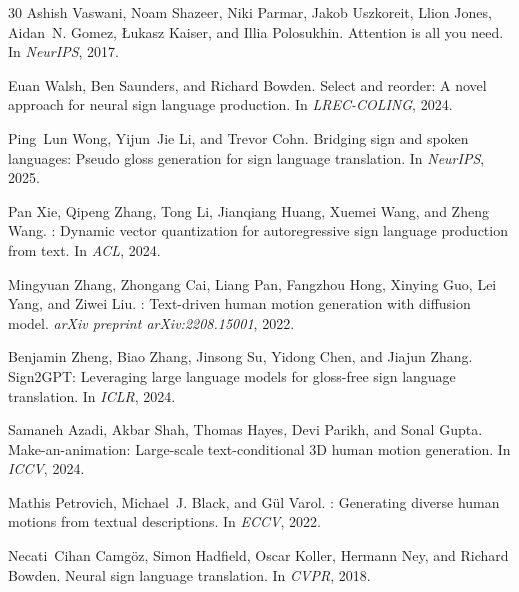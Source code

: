 \documentclass{article}
\begin{document}
\begin{thebibliography}{30}
Ashish Vaswani, Noam Shazeer, Niki Parmar, Jakob Uszkoreit, Llion Jones, Aidan~N. Gomez, \L{}ukasz Kaiser, and Illia Polosukhin.
\newblock Attention is all you need.
\newblock In \emph{NeurIPS}, 2017.

Euan Walsh, Ben Saunders, and Richard Bowden.
\newblock Select and reorder: A novel approach for neural sign language production.
\newblock In \emph{LREC-COLING}, 2024.

Ping~Lun Wong, Yijun~Jie Li, and Trevor Cohn.
\newblock Bridging sign and spoken languages: Pseudo gloss generation for sign language translation.
\newblock In \emph{NeurIPS}, 2025.

Pan Xie, Qipeng Zhang, Tong Li, Jianqiang Huang, Xuemei Wang, and Zheng Wang.
: Dynamic vector quantization for autoregressive sign language production from text.
\newblock In \emph{ACL}, 2024.

Mingyuan Zhang, Zhongang Cai, Liang Pan, Fangzhou Hong, Xinying Guo, Lei Yang, and Ziwei Liu.
: Text-driven human motion generation with diffusion model.
\newblock \emph{arXiv preprint arXiv:2208.15001}, 2022.

Benjamin Zheng, Biao Zhang, Jinsong Su, Yidong Chen, and Jiajun Zhang.
\newblock Sign2{GPT}: Leveraging large language models for gloss-free sign language translation.
\newblock In \emph{ICLR}, 2024.

Samaneh Azadi, Akbar Shah, Thomas Hayes, Devi Parikh, and Sonal Gupta.
\newblock Make-an-animation: Large-scale text-conditional {3D} human motion generation.
\newblock In \emph{ICCV}, 2024.

Mathis Petrovich, Michael~J. Black, and G{\"u}l Varol.
: Generating diverse human motions from textual descriptions.
\newblock In \emph{ECCV}, 2022.

Necati~Cihan Camg{\"o}z, Simon Hadfield, Oscar Koller, Hermann Ney, and Richard Bowden.
\newblock Neural sign language translation.
\newblock In \emph{CVPR}, 2018.

\end{thebibliography}
\end{document}
